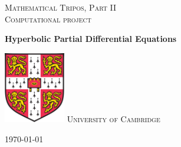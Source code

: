 \documentclass[a4paper,11pt]{article}
\begin{document}
\lstset{language = Matlab}
\begin{titlepage} %
	
	\center %
	
	\vspace*{3cm}

	\textsc{Mathematical Tripos, Part II}\\
	\textsc{Computational project}
	\begin{center}
      {\huge\bfseries Hyperbolic Partial Differential Equations\\[0.4cm]
}     \end{center}
	
	\vfill
	\vfill\vfill\vfill\vfill
	\includegraphics*[width = 2.675cm, height = 3.1cm]{coat.png}
	\vfill
    \textsc{University of Cambridge}
	
	\vspace*{\fill}
	\vfill
	{\large\today} 
	\vfill
	
\end{titlepage}
\setcounter{tocdepth}{3}
\tableofcontents
\newpage
\end{document}
